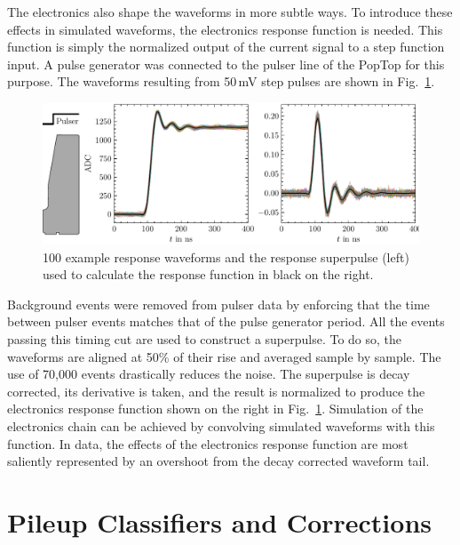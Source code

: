 The electronics also shape the waveforms in more subtle ways. To introduce these effects in simulated waveforms, the electronics response function is needed. This function is simply the normalized output of the current signal to a step function input. A pulse generator was connected to the pulser line of the PopTop for this purpose. The waveforms resulting from 50\,mV step pulses are shown in Fig.~\ref{fig:electronics_response}. 
\begin{figure}[htb]
    \centering
	\vspace*{-10pt}
    \includegraphics[width=6in]{figs/param/electronics_responce_6_9in.pdf}
	\vspace*{-10mm}
    \caption{100 example response waveforms and the response superpulse (left) used to calculate the response function in black on the right.}
    \label{fig:electronics_response}
	\vspace*{-5pt}
\end{figure}

Background events were removed from pulser data by enforcing that the time between pulser events matches that of the pulse generator period. All the events passing this timing cut are used to construct a superpulse. To do so, the waveforms are aligned at 50\% of their rise and averaged sample by sample. The use of 70,000 events drastically reduces the noise. The superpulse is decay corrected, its derivative is taken, and the result is normalized to produce the electronics response function shown on the right in Fig.~\ref{fig:electronics_response}. Simulation of the electronics chain can be achieved by convolving simulated waveforms with this function. In data, the effects of the electronics response function are most saliently represented by an overshoot from the decay corrected waveform tail.  

\section{Pileup Classifiers and Corrections} \label{sec:pileup}

